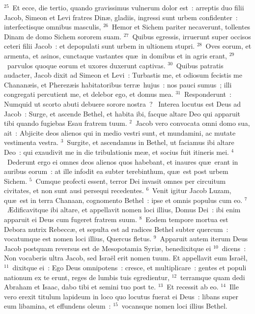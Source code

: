 ${}^{25}$~Et ecce, die tertio, quando gravissimus vulnerum dolor est~: arreptis duo filii Jacob, Simeon et Levi fratres Din\ae , gladiis, ingressi sunt urbem confidenter~: interfectisque omnibus masculis,
${}^{26}$~Hemor et Sichem pariter necaverunt, tollentes Dinam de domo Sichem sororem suam.
${}^{27}$~Quibus egressis, irruerunt super occisos ceteri filii Jacob~: et depopulati sunt urbem in ultionem stupri.
${}^{28}$~Oves eorum, et armenta, et asinos, cunctaque vastantes qu\ae\ in domibus et in agris erant,
${}^{29}$~parvulos quoque eorum et uxores duxerunt captivas.
${}^{30}$~Quibus patratis audacter, Jacob dixit ad Simeon et Levi~: Turbastis me, et odiosum fecistis me Chanan\ae is, et Pherez\ae is habitatoribus terr\ae\ hujus~: nos pauci sumus~; illi congregati percutient me, et delebor ego, et domus mea.
${}^{31}$~Responderunt~: Numquid ut scorto abuti debuere sorore nostra~?
~Interea locutus est Deus ad Jacob~: Surge, et ascende Bethel, et habita ibi, facque altare Deo qui apparuit tibi quando fugiebas Esau fratrem tuum.
${}^{2}$~Jacob vero convocata omni domo sua, ait~: Abjicite deos alienos qui in medio vestri sunt, et mundamini, ac mutate vestimenta vestra.
${}^{3}$~Surgite, et ascendamus in Bethel, ut faciamus ibi altare Deo~: qui exaudivit me in die tribulationis me\ae , et socius fuit itineris mei.
${}^{4}$~Dederunt ergo ei omnes deos alienos quos habebant, et inaures qu\ae\ erant in auribus eorum~: at ille infodit ea subter terebinthum, qu\ae\ est post urbem Sichem.
${}^{5}$~Cumque profecti essent, terror Dei invasit omnes per circuitum civitates, et non sunt ausi persequi recedentes.
${}^{6}$~Venit igitur Jacob Luzam, qu\ae\ est in terra Chanaan, cognomento Bethel~: ipse et omnis populus cum eo.
${}^{7}$~\AE dificavitque ibi altare, et appellavit nomen loci illius, Domus Dei~: ibi enim apparuit ei Deus cum fugeret fratrem suum.
${}^{8}$~Eodem tempore mortua est Debora nutrix Rebecc\ae , et sepulta est ad radices Bethel subter quercum~: vocatumque est nomen loci illius, Quercus fletus.
${}^{9}$~Apparuit autem iterum Deus Jacob postquam reversus est de Mesopotamia Syri\ae , benedixitque ei
${}^{10}$~dicens~: Non vocaberis ultra Jacob, sed Isra\"el erit nomen tuum. Et appellavit eum Isra\"el,
${}^{11}$~dixitque ei~: Ego Deus omnipotens~: cresce, et multiplicare~: gentes et populi nationum ex te erunt, reges de lumbis tuis egredientur,
${}^{12}$~terramque quam dedi Abraham et Isaac, dabo tibi et semini tuo post te.
${}^{13}$~Et recessit ab eo.
${}^{14}$~Ille vero erexit titulum lapideum in loco quo locutus fuerat ei Deus~: libans super eum libamina, et effundens oleum~:
${}^{15}$~vocansque nomen loci illius Bethel.


